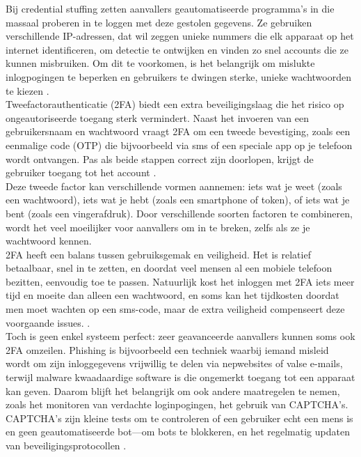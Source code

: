 Bij credential stuffing zetten aanvallers geautomatiseerde programma’s in die massaal proberen in te loggen met deze gestolen gegevens. Ze gebruiken verschillende IP-adressen, dat wil zeggen unieke nummers die elk apparaat op het internet identificeren, om detectie te ontwijken en vinden zo snel accounts die ze kunnen misbruiken. Om dit te voorkomen, is het belangrijk om mislukte inlogpogingen te beperken en gebruikers te dwingen sterke, unieke wachtwoorden te kiezen \autocite{Chinnasamy2025}.\\

Tweefactorauthenticatie (2FA) biedt een extra beveiligingslaag die het risico op ongeautoriseerde toegang sterk vermindert. Naast het invoeren van een gebruikersnaam en wachtwoord vraagt 2FA om een tweede bevestiging, zoals een eenmalige code (OTP) die bijvoorbeeld via sms of een speciale app op je telefoon wordt ontvangen. Pas als beide stappen correct zijn doorlopen, krijgt de gebruiker toegang tot het account \autocite{Jurisons2024}.\\

Deze tweede factor kan verschillende vormen aannemen: iets wat je weet (zoals een wachtwoord), iets wat je hebt (zoals een smartphone of token), of iets wat je bent (zoals een vingerafdruk). Door verschillende soorten factoren te combineren, wordt het veel moeilijker voor aanvallers om in te breken, zelfs als ze je wachtwoord kennen.\\

2FA heeft een balans tussen gebruiksgemak en veiligheid. Het is relatief betaalbaar, snel in te zetten, en doordat veel mensen al een mobiele telefoon bezitten, eenvoudig toe te passen. Natuurlijk kost het inloggen met 2FA iets meer tijd en moeite dan alleen een wachtwoord, en soms kan het tijdkosten doordat men moet wachten op een sms-code, maar de extra veiligheid compenseert deze voorgaande issues. \autocite{Jurisons2024}.\\

Toch is geen enkel systeem perfect: zeer geavanceerde aanvallers kunnen soms ook 2FA omzeilen. Phishing is bijvoorbeeld een techniek waarbij iemand misleid wordt om zijn inloggegevens vrijwillig te delen via nepwebsites of valse e-mails, terwijl malware kwaadaardige software is die ongemerkt toegang tot een apparaat kan geven. Daarom blijft het belangrijk om ook andere maatregelen te nemen, zoals het monitoren van verdachte loginpogingen, het gebruik van CAPTCHA’s. CAPTCHA's zijn kleine tests om te controleren of een gebruiker echt een mens is en geen geautomatiseerde bot—om bots te blokkeren, en het regelmatig updaten van beveiligingsprotocollen \autocite{Chinnasamy2025}.\\


